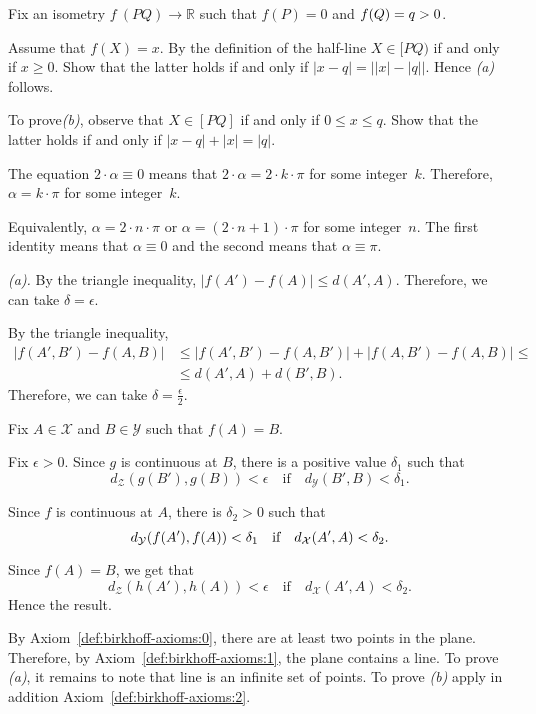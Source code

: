 Fix an isometry $f\:(P Q)\to \mathbb{R}$ such that $f(P)=0$ and $f(Q)\z=q>0$.

Assume that $f(X)=x$.
By the definition of the half-line $X\in[PQ)$ if and only if $x\ge 0$.
Show that the latter holds if and only if 
$|x-q|=\bigl||x|-|q|\bigr|$.
Hence \textit{(a)} follows.

To prove\textit{(b)}, observe that $X\in [PQ]$ if and only if $0\le x\le q$.
Show that the latter holds if and only if 
$|x-q|+|x|=|q|$.

The equation
$2\cdot\alpha\equiv 0$
means that $2\cdot\alpha=2\cdot k\cdot\pi$ for some integer~$k$.
Therefore,
$\alpha=k\cdot\pi$ for some integer~$k$.

Equivalently, $\alpha=2\cdot n\cdot \pi$ or $\alpha=(2\cdot n+1)\cdot \pi$ for some integer~$n$.
The first identity means that $\alpha\equiv 0$ and the second means that $\alpha\equiv \pi$.

 \textit{(a).}
By the triangle inequality,
$|f(A')-f(A)|\le d(A',A)$.
Therefore, we can take $\delta=\epsilon$.

By the triangle inequality,
\begin{align*}
|f(A',B')-f(A,B)|
&\le |f(A',B')-f(A,B')|
+|f(A,B')-f(A,B)|
\le
\\
&\le d(A',A)+d(B',B).
\end{align*}
Therefore, we can take $\delta=\tfrac\epsilon2$.

Fix $A\in \mathcal{X}$ and $B\in\mathcal{Y}$
such that $f(A)=B$.

Fix $\epsilon>0$.
Since $g$ is continuous at $B$, there is a positive value $\delta_1$ such that 
$$d_{\mathcal{Z}}(g(B'),g(B))<\epsilon
\quad
\text{if}
\quad
d_{\mathcal{Y}}(B',B)<\delta_1.$$ 

Since $f$ is continuous at $A$, there is $\delta_2>0$ such that 
$$d_{\mathcal{Y}}(f(A'),f(A))\z<\delta_1
\quad
\text{if}
\quad
d_{\mathcal{X}}(A',A)<\delta_2.$$ 

Since $f(A)=B$, we get that
$$d_{\mathcal{Z}}(h(A'),h(A))<\epsilon
\quad
\text{if}
\quad
d_{\mathcal{X}}(A',A)<\delta_2.$$ 
Hence the result.

\setcounter{eqtn}{0}

 By Axiom~\ref{def:birkhoff-axioms:0}, there are at least two points in the plane.
Therefore, by Axiom~\ref{def:birkhoff-axioms:1}, 
the plane contains a line. 
To prove \textit{(a)}, it remains to note that line is an infinite set of points.
To prove \textit{(b)} apply in addition Axiom~\ref{def:birkhoff-axioms:2}.

